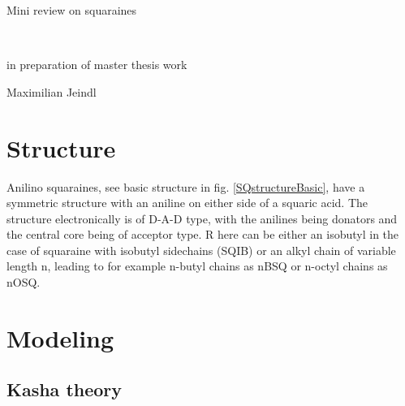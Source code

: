\documentclass{article}
\begin{document}
\begin{center}
\begin{Large}

Mini review on squaraines
\end{Large}\\
\begin{large}
in preparation of master thesis work\\
\end{large}
\normalsize Maximilian Jeindl\\
\end{center}


\begin{multicols}{2}
\section{Structure}
Anilino squaraines, see basic structure in fig. \ref{SQstructureBasic}, have a symmetric structure with an aniline on either side of a squaric acid. The structure electronically is of D-A-D type, with the anilines being donators and the central core being of acceptor type. R here can be either an isobutyl in the case of squaraine with isobutyl sidechains (SQIB) or an alkyl chain of variable length n, leading to for example n-butyl chains as nBSQ or n-octyl chains as nOSQ. \cite{Balzer2022}

\section{Modeling}
\subsection{Kasha theory}


\end{multicols}
\end{document}

